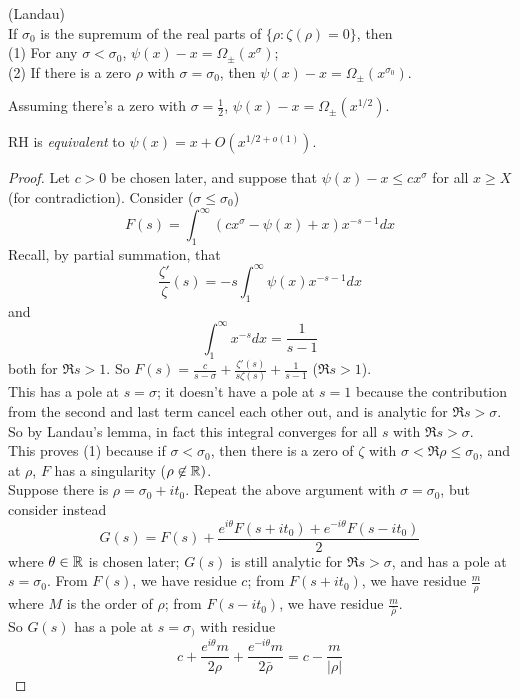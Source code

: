 \documentclass[a4paper]{article}
\begin{document}
\begin{thm} (Landau)\\
If $\sigma_0$ is the supremum of the real parts of $\{\rho: \zeta(\rho) = 0\}$, then\\
(1) For any $\sigma < \sigma_0$, $\psi(x)-x = \Omega_\pm(x^{\sigma})$;\\
(2) If there is a zero $\rho$ with $\sigma=\sigma_0$, then $\psi(x)-x = \Omega_\pm(x^{\sigma_0})$.
\begin{coro}
Assuming there's a zero with $\sigma=\frac{1}{2}$, $\psi(x) - x = \Omega_{\pm}(x^{1/2})$.
\end{coro}
\begin{coro}
RH is \emph{equivalent} to $\psi(x) = x+O(x^{1/2+o(1)})$.
\end{coro}
\begin{proof}
Let $c>0$ be chosen later, and suppose that $\psi(x) - x \leq cx^\sigma$ for all $x \geq X$ (for contradiction). Consider ($\sigma \leq \sigma_0$) 
\[
F(s) = \int_1^\infty (cx^\sigma - \psi(x)+x) x^{-s-1} dx
\]
Recall, by partial summation, that
\[
\frac{\zeta'}{\zeta}(s) = -s\int_1^\infty \psi(x) x^{-s-1} dx
\]
and
\[
\int_1^\infty x^{-s} dx = \frac{1}{s-1}
\]
both for $\Re s > 1$. So $F(s) = \frac{c}{s-\sigma}+\frac{\zeta'(s)}{s\zeta(s)}+\frac{1}{s-1}$ ($\Re s > 1$).\\
This has a pole at $s=\sigma$; it doesn't have a pole at $s=1$ because the contribution from the second and last term cancel each other out, and is analytic for $\Re s > \sigma$.\\
So by Landau's lemma, in fact this integral converges for all $s$ with $\Re s > \sigma$.\\
This proves (1) because if $\sigma < \sigma_0$, then there is a zero of $\zeta$ with $\sigma < \Re \rho \leq \sigma_0$, and at $\rho$, $F$ has a singularity ($\rho \not\in \mathbb{R})$.\\
Suppose there is $\rho = \sigma_0+it_0$. Repeat the above argument with $\sigma=\sigma_0$, but consider instead
\[
G(s) = F(s) + \frac{e^{i\theta} F(s+it_0) + e^{-i\theta} F(s-it_0)}{2}
\]
where $\theta \in \mathbb{R}$ is chosen later; $G(s)$ is still analytic for $\Re s > \sigma$, and has a pole at $s=\sigma_0$. From $F(s)$, we have residue $c$; from $F(s+it_0)$, we have residue $\frac{m}{\rho}$ where $M$ is the order of $\rho$; from $F(s-it_0)$, we have residue $\frac{m}{\bar{\rho}}$.\\
So $G(s)$ has a pole at $s=\sigma_)$ with residue
\[
c+\frac{e^{i\theta}m}{2\rho} + \frac{e^{-i\theta}m}{2\bar{\rho}} = c-\frac{m}{|\rho|}
\]
\end{proof}
\end{thm}
\end{document}
